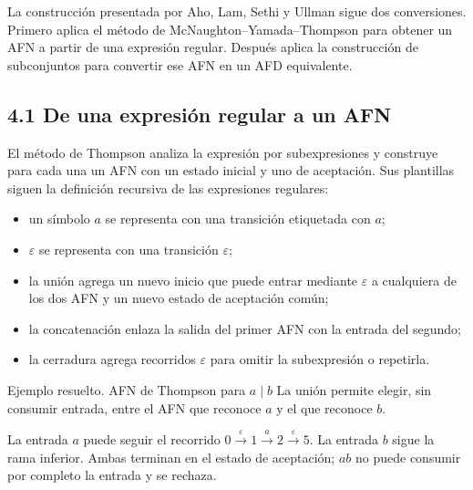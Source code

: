 \documentclass[11pt,spanish]{article}
\begin{document}
La construcción presentada por Aho, Lam, Sethi y Ullman sigue dos conversiones. Primero aplica el método de McNaughton--Yamada--Thompson para obtener un AFN a partir de una expresión regular. Después aplica la construcción de subconjuntos para convertir ese AFN en un AFD equivalente.

\subsection*{4.1 De una expresión regular a un AFN}

El método de Thompson analiza la expresión por subexpresiones y construye para cada una un AFN con un estado inicial y uno de aceptación. Sus plantillas siguen la definición recursiva de las expresiones regulares:

\begin{itemize}
    \item un símbolo \(a\) se representa con una transición etiquetada con \(a\);
    \item \(\varepsilon\) se representa con una transición \(\varepsilon\);
    \item la unión agrega un nuevo inicio que puede entrar mediante \(\varepsilon\) a cualquiera de los dos AFN y un nuevo estado de aceptación común;
    \item la concatenación enlaza la salida del primer AFN con la entrada del segundo;
    \item la cerradura agrega recorridos \(\varepsilon\) para omitir la subexpresión o repetirla.
\end{itemize}

\begin{ejemplo}{Ejemplo resuelto. AFN de Thompson para \(a\mid b\)}
La unión permite elegir, sin consumir entrada, entre el AFN que reconoce \(a\) y el que reconoce \(b\).

\begin{center}
\end{center}

La entrada \(a\) puede seguir el recorrido \(0\xrightarrow{\varepsilon}1\xrightarrow{a}2\xrightarrow{\varepsilon}5\). La entrada \(b\) sigue la rama inferior. Ambas terminan en el estado de aceptación; \(ab\) no puede consumir por completo la entrada y se rechaza.
\end{ejemplo}
\end{document}
